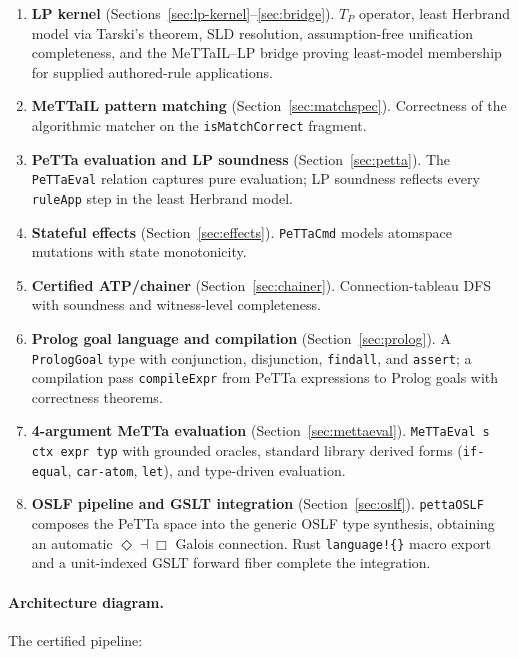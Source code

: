 \documentclass[]{article}
\newcommand{\code}[1]{\texttt{#1}}
\newcommand{\MeTTa}{\textup{MeTTa}}
\newcommand{\PeTTa}{\textup{PeTTa}}
\newcommand{\MeTTaIL}{\textup{MeTTaIL}}
\newcommand{\OSLF}{\textup{OSLF}}
\begin{document}
\begin{enumerate}
\item \textbf{LP kernel} (Sections~\ref{sec:lp-kernel}--\ref{sec:bridge}).
  $T_P$ operator, least Herbrand model via Tarski's theorem, SLD resolution,
  assumption-free unification completeness, and the \MeTTaIL{}--LP bridge
  proving least-model membership for supplied authored-rule applications.

\item \textbf{\MeTTaIL{} pattern matching} (Section~\ref{sec:matchspec}).
  Correctness of the algorithmic matcher on the \code{isMatchCorrect} fragment.

\item \textbf{\PeTTa{} evaluation and LP soundness} (Section~\ref{sec:petta}).
  The \code{PeTTaEval} relation captures pure evaluation; LP soundness reflects
  every \code{ruleApp} step in the least Herbrand model.

\item \textbf{Stateful effects} (Section~\ref{sec:effects}).
  \code{PeTTaCmd} models atomspace mutations with state monotonicity.

\item \textbf{Certified ATP/chainer} (Section~\ref{sec:chainer}).
  Connection-tableau DFS with soundness and witness-level completeness.

\item \textbf{Prolog goal language and compilation} (Section~\ref{sec:prolog}).
  A \code{PrologGoal} type with conjunction, disjunction, \code{findall}, and
  \code{assert}; a compilation pass \code{compileExpr} from \PeTTa{} expressions
  to Prolog goals with correctness theorems.

\item \textbf{4-argument \MeTTa{} evaluation} (Section~\ref{sec:mettaeval}).
  \code{MeTTaEval s ctx expr typ} with grounded oracles, standard library derived
  forms (\code{if-equal}, \code{car-atom}, \code{let}), and type-driven evaluation.

\item \textbf{\OSLF{} pipeline and GSLT integration} (Section~\ref{sec:oslf}).
  \code{pettaOSLF} composes the \PeTTa{} space into the generic \OSLF{} type
  synthesis, obtaining an automatic $\Diamond \dashv \Box$ Galois connection.
  Rust \code{language!\{\}} macro export and a unit-indexed GSLT forward fiber
  complete the integration.
\end{enumerate}

\paragraph{Architecture diagram.}
The certified pipeline:
\end{document}
